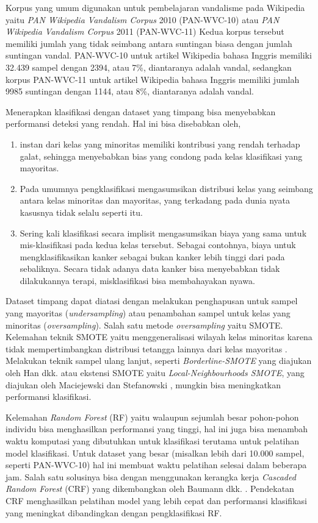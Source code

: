 Korpus yang umum digunakan untuk pembelajaran vandalisme pada Wikipedia yaitu
\textit{PAN Wikipedia Vandalism Corpus} 2010 (PAN-WVC-10)
\cite{potthast:2010b}
atau
\textit{PAN Wikipedia Vandalism Corpus} 2011 (PAN-WVC-11)
\cite{potthast:2010b}
Kedua korpus tersebut memiliki jumlah yang tidak seimbang antara suntingan
biasa dengan jumlah suntingan vandal.
PAN-WVC-10 untuk artikel Wikipedia bahasa Inggris memiliki 32.439 sampel dengan
2394, atau 7\%, diantaranya adalah vandal, sedangkan korpus PAN-WVC-11 untuk
artikel Wikipedia bahasa Inggris memiliki jumlah 9985 suntingan dengan 1144,
atau 8\%, diantaranya adalah vandal.

\newpage
Menerapkan klasifikasi dengan dataset yang timpang bisa menyebabkan performansi
deteksi yang rendah.
Hal ini bisa disebabkan oleh,
\begin{enumerate}
	\item instan dari kelas yang minoritas memiliki kontribusi yang rendah
	terhadap galat, sehingga menyebabkan bias yang condong pada kelas
	klasifikasi yang mayoritas.
	\item Pada umumnya pengklasifikasi mengasumsikan distribusi kelas yang
	seimbang antara kelas minoritas dan mayoritas, yang terkadang pada
	dunia nyata kasusnya tidak selalu seperti itu.
	\item Sering kali klasifikasi secara implisit mengasumsikan biaya yang
	sama untuk mis-klasifikasi pada kedua kelas tersebut.
	Sebagai contohnya, biaya untuk mengklasifikasikan kanker sebagai bukan
	kanker lebih tinggi dari pada sebaliknya.
	Secara tidak adanya data kanker bisa menyebabkan tidak dilakukannya
	terapi, misklasifikasi bisa membahayakan nyawa.
\end{enumerate}

Dataset timpang dapat diatasi dengan melakukan penghapusan untuk sampel yang
mayoritas (\textit{undersampling}) atau penambahan sampel untuk kelas
yang minoritas (\textit{oversampling}).
Salah satu metode \textit{oversampling} yaitu SMOTE.
Kelemahan teknik SMOTE yaitu menggeneralisasi wilayah kelas
minoritas karena tidak mempertimbangkan distribusi tetangga lainnya dari
kelas mayoritas
\cite{maciejewski2011local}.
Melakukan teknik sampel ulang lanjut, seperti
\textit{Borderline-SMOTE}
yang diajukan oleh Han dkk.
\cite{han2005borderline}
atau ekstensi SMOTE yaitu \textit{Local-Neighbourhoods SMOTE}, yang diajukan
oleh Maciejewski dan Stefanowski
\cite{maciejewski2011local},
mungkin bisa meningkatkan performansi klasifikasi.

Kelemahan \textit{Random Forest} (RF) yaitu walaupun sejumlah besar pohon-pohon
individu bisa menghasilkan performansi yang tinggi, hal ini juga bisa menambah
waktu komputasi yang dibutuhkan untuk klasifikasi terutama untuk pelatihan
model klasifikasi.
Untuk dataset yang besar (misalkan lebih dari 10.000 sampel, seperti
PAN-WVC-10) hal ini membuat waktu pelatihan selesai dalam beberapa jam.
Salah satu solusinya bisa dengan menggunakan kerangka kerja
\textit{Cascaded Random Forest} (CRF)
yang dikembangkan oleh Baumann dkk.
\cite{baumann2013cascaded}.
Pendekatan CRF menghasilkan pelatihan model yang lebih cepat dan performansi
klasifikasi yang meningkat dibandingkan dengan pengklasifikasi RF.

